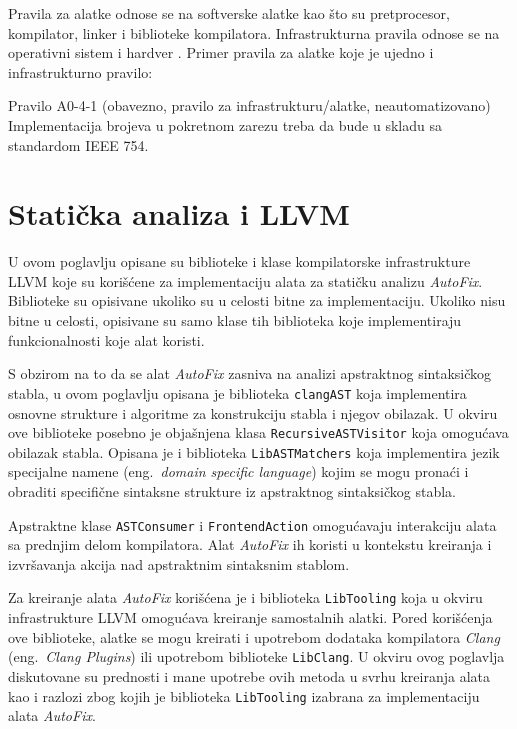 \documentclass[12pt,oneside]{memoir}
\begin{document}
Pravila za alatke odnose se na softverske alatke kao što su pretprocesor, kompilator, linker i biblioteke kompilatora.
Infrastrukturna pravila odnose se na operativni sistem i hardver \cite{AutosarGuidelines}.
Primer pravila za alatke koje je ujedno i infrastrukturno pravilo:

\begin{center}
\begin{tcolorbox}
Pravilo A0-4-1 (obavezno, pravilo za infrastrukturu/alatke, neautomatizovano) \\
Implementacija brojeva u pokretnom zarezu treba da bude u skladu sa standardom IEEE 754.
\end{tcolorbox}
\end{center}


\chapter{Stati\v{c}ka analiza i LLVM}
\label{chp:llvm}

U ovom poglavlju opisane su biblioteke i klase kompilatorske infrastrukture LLVM koje su kori\v{s}\'{c}ene za implementaciju alata za stati\v{c}ku analizu \textit{AutoFix}. Biblioteke su opisivane ukoliko su u celosti
bitne za implementaciju. Ukoliko nisu bitne u celosti, opisivane su samo klase tih biblioteka koje implementiraju funkcionalnosti koje alat koristi. \par 
S obzirom na to da se alat \textit{AutoFix} zasniva na analizi apstraktnog sintaksi\v{c}kog stabla, u ovom poglavlju opisana je biblioteka \texttt{clangAST} koja implementira osnovne
strukture i algoritme za konstrukciju stabla i njegov obilazak. U okviru ove biblioteke posebno je obja\v{s}njena klasa \texttt{RecursiveASTVisitor} koja omogu\'{c}ava obilazak stabla.
Opisana je i biblioteka \texttt{LibASTMatchers} koja implementira jezik specijalne namene (eng.~\textit{domain specific language}) kojim se mogu prona\'{c}i i obraditi specifi\v{c}ne sintaksne strukture iz apstraktnog sintaksi\v{c}kog stabla.
\par
Apstraktne klase \texttt{ASTConsumer} i \texttt{FrontendAction} omogu\'{c}avaju interakciju alata sa prednjim delom kompilatora. Alat \textit{AutoFix} ih
koristi u kontekstu kreiranja i izvr\v{s}avanja akcija nad apstraktnim sintaksnim
stablom.
\par
Za kreiranje alata \textit{AutoFix} kori\v{s}\'{c}ena je i biblioteka \texttt{LibTooling} koja u okviru infrastrukture LLVM omogu\'{c}ava kreiranje samostalnih alatki. Pored kori\v{s}\'{c}enja ove biblioteke, alatke se mogu kreirati i upotrebom dodataka kompilatora \textit{Clang} (eng.~\textit{Clang Plugins}) ili upotrebom biblioteke \texttt{LibClang}. U okviru ovog poglavlja diskutovane su prednosti i mane upotrebe ovih metoda u svrhu kreiranja alata kao i razlozi zbog kojih je biblioteka \texttt{LibTooling} izabrana za implementaciju alata \textit{AutoFix}.
\end{document}
